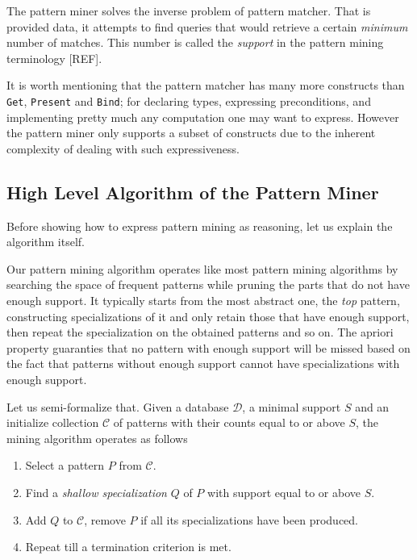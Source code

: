 \documentclass[runningheads]{llncs}
\begin{document}
The pattern miner solves the inverse problem of pattern matcher. That
is provided data, it attempts to find queries that would retrieve a
certain \emph{minimum} number of matches. This number is called the
\emph{support} in the pattern mining terminology [REF].

It is worth mentioning that the pattern matcher has many more
constructs than \texttt{Get}, \texttt{Present} and \texttt{Bind}; for
declaring types, expressing preconditions, and implementing pretty
much any computation one may want to express. However the pattern
miner only supports a subset of constructs due to the inherent
complexity of dealing with such expressiveness.

\subsection{High Level Algorithm of the Pattern Miner}

Before showing how to express pattern mining as reasoning, let us
explain the algorithm itself.

Our pattern mining algorithm operates like most pattern mining
algorithms \cite{Chi2005Freq} by searching the space of frequent
patterns while pruning the parts that do not have enough support. It
typically starts from the most abstract one, the \emph{top} pattern,
constructing specializations of it and only retain those that have
enough support, then repeat the specialization on the obtained
patterns and so on. The apriori property
\cite{Agrawal1994fastalgorithms} guaranties that no pattern with
enough support will be missed based on the fact that patterns without
enough support cannot have specializations with enough support.

Let us semi-formalize that. Given a database $\mathcal{D}$, a minimal
support $S$ and an initialize collection $\mathcal{C}$ of patterns
with their counts equal to or above $S$, the mining algorithm operates
as follows
\begin{enumerate}
\item Select a pattern $P$ from $\mathcal{C}$.
\item Find a \emph{shallow specialization} $Q$ of $P$
  with support equal to or above $S$.
\item Add $Q$ to $\mathcal{C}$, remove $P$ if all its specializations
  have been produced.
\item Repeat till a termination criterion is met.
\end{enumerate}
\end{document}
